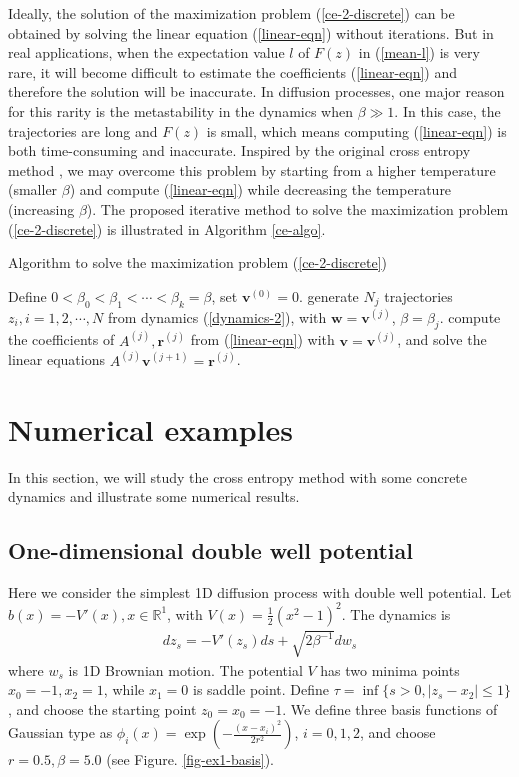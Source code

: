 \documentclass[final]{siamltex}
\begin{document}
Ideally, the solution of the maximization problem (\ref{ce-2-discrete}) can be
obtained by solving the linear equation (\ref{linear-eqn}) without iterations. But in real
applications, when the expectation value $l$ of $F(z)$ in (\ref{mean-l}) is very rare, it will become
difficult to estimate the coefficients (\ref{linear-eqn}) and therefore the solution
will be inaccurate. In diffusion processes, one major reason for this rarity
is the metastability in the dynamics when $\beta \gg 1$. In this case, the
trajectories are long and $F(z)$ is small, which means computing
(\ref{linear-eqn}) is both time-consuming and inaccurate. Inspired by the
original cross entropy method \cite{ce_tutorial},
we may overcome this problem by starting from a higher temperature (smaller $\beta$) and compute
(\ref{linear-eqn}) while decreasing the temperature (increasing $\beta$). The proposed iterative
method to solve the maximization problem (\ref{ce-2-discrete}) is illustrated in Algorithm \ref{ce-algo}.
\begin{algorithm}
  \caption{Algorithm to solve the maximization problem (\ref{ce-2-discrete}) \label{ce-algo}}
  \begin{algorithmic}[1]
    \State Define $0 < \beta_0 < \beta_1 < \cdots <\beta_k = \beta$, set
    $\bm{v}^{(0)} = 0$.
    \State generate $N_j$ trajectories $z_i, i=1,2,\cdots, N$ from dynamics (\ref{dynamics-2}), with
    $\bm{w} = \bm{v}^{(j)}$, $\beta = \beta_j$.
    \State compute the coefficients of $A^{(j)}, \bm{r}^{(j)}$ from (\ref{linear-eqn}) with $\bm{v} =
    \bm{v}^{(j)}$, and solve the linear equations $A^{(j)}\bm{v}^{(j+1)} =
    \bm{r}^{(j)}$.
    \EndFor 
  \end{algorithmic}
  \label{algo1}
\end{algorithm}
\FloatBarrier
\section{Numerical examples}
\label{sec-examples}
In this section, we will study the cross entropy method with some concrete dynamics and
illustrate some numerical results.
\subsection{One-dimensional double well potential}
Here we consider the simplest 1D diffusion process with double well potential.
Let $b(x) = - V'(x), x\in \mathbb{R}^1$, with $V(x) = \frac{1}{2}(x^2 - 1)^2$.
The dynamics is 
\begin{align}
  dz_s = - V'(z_s) ds + \sqrt{2\beta^{-1}} dw_s
\end{align}
where $w_s$ is 1D Brownian motion. The potential $V$ has two minima points
$x_0 = -1, x_2 = 1$, while $x_1 = 0$ is
saddle point. Define $\tau = \inf\{s >0, |z_s - x_2| \le 1 \}$, and choose
the starting point $z_0 = x_0 =
-1$. We define three basis functions of Gaussian type as $\phi_i(x) = \exp(-\frac{(x -
x_i)^2}{2r^2})$, $i = 0, 1, 2$, and choose $r = 0.5, \beta = 5.0$ (see Figure. \ref{fig-ex1-basis}).
\end{document}
